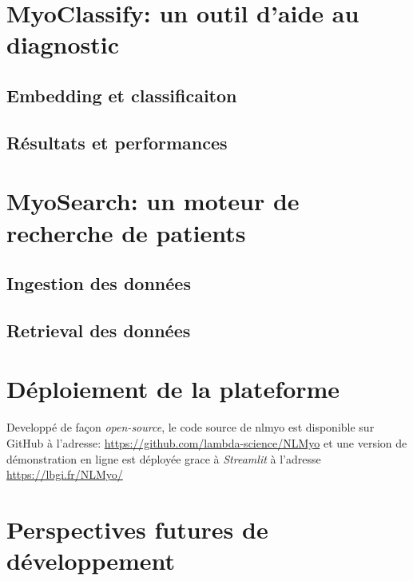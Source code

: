 \section{MyoClassify: un outil d'aide au diagnostic}
\subsection{Embedding et classificaiton}
\subsection{Résultats et performances}
\section{MyoSearch: un moteur de recherche de patients}
\subsection{Ingestion des données}
\subsection{Retrieval des données}
\section{Déploiement de la plateforme}
Developpé de façon \textit{open-source}, le code source de \gls{nlmyo} est disponible sur GitHub à l'adresse: \href{https://github.com/lambda-science/NLMyo}{https://github.com/lambda-science/NLMyo} et une version de démonstration en ligne est déployée grace à \textit{Streamlit} à l'adresse \href{https://lbgi.fr/NLMyo/}{https://lbgi.fr/NLMyo/}
\section{Perspectives futures de développement}